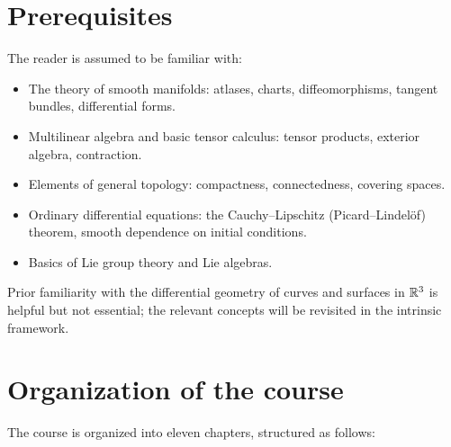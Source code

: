 \section*{Prerequisites}

The reader is assumed to be familiar with:
\begin{itemize}
    \item The theory of smooth manifolds: atlases, charts, diffeomorphisms,
          tangent bundles, differential forms.
    \item Multilinear algebra and basic tensor calculus: tensor products,
          exterior algebra, contraction.
    \item Elements of general topology: compactness, connectedness, covering spaces.
    \item Ordinary differential equations: the Cauchy--Lipschitz (Picard--Lindel\"of)
          theorem, smooth dependence on initial conditions.
    \item Basics of Lie group theory and Lie algebras.
\end{itemize}

Prior familiarity with the differential geometry of curves and surfaces in $\mathbb{R}^3$
is helpful but not essential; the relevant concepts will be revisited in the
intrinsic framework.

\section*{Organization of the course}

The course is organized into eleven chapters, structured as follows:


